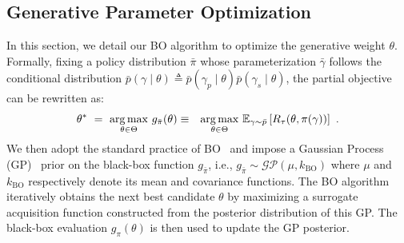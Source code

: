 \subsection{Generative Parameter Optimization}
\label{app-ks-subsec:theta}

In this section, we detail our BO algorithm to optimize the generative weight $\theta$. Formally, fixing a policy distribution $\bar{\pi}$ whose parameterization $\bar{\gamma}$ follows the conditional distribution $\bar{p}(\gamma \mid \theta) \triangleq \bar{p}(\gamma_p \mid \theta)\bar{p}(\gamma_s \mid \theta)$, the partial objective can be rewritten as:
\begin{eqnarray}
\theta^\ast \ = \ \underset{\theta\in\Theta}{\operatorname{\arg\max}} \  g_{\bar{\pi}}(\theta) & \equiv & \underset{\theta \in \Theta}{\operatorname{\arg\max}} \ \mathbb{E}_{\gamma \sim \bar{p}}\left[ R_\tau(\theta, \pi(\gamma))\right] \ .
\end{eqnarray}
We then adopt the standard practice of BO~\cite{Snoek12} and impose a Gaussian Process (GP)~\cite{Rasmussen06} prior on the black-box function $g_{\bar{\pi}}$, i.e., $g_{\bar{\pi}} \sim \mathcal{GP}(\mu, k_{\mathrm{BO}})$ where $\mu$ and $k_{\mathrm{BO}}$ respectively denote its mean and covariance functions. The BO algorithm iteratively obtains the next best candidate $\theta$ by maximizing a surrogate acquisition function constructed from the posterior distribution of this GP. The black-box evaluation $g_\pi(\theta)$ is then used to update the GP posterior.

